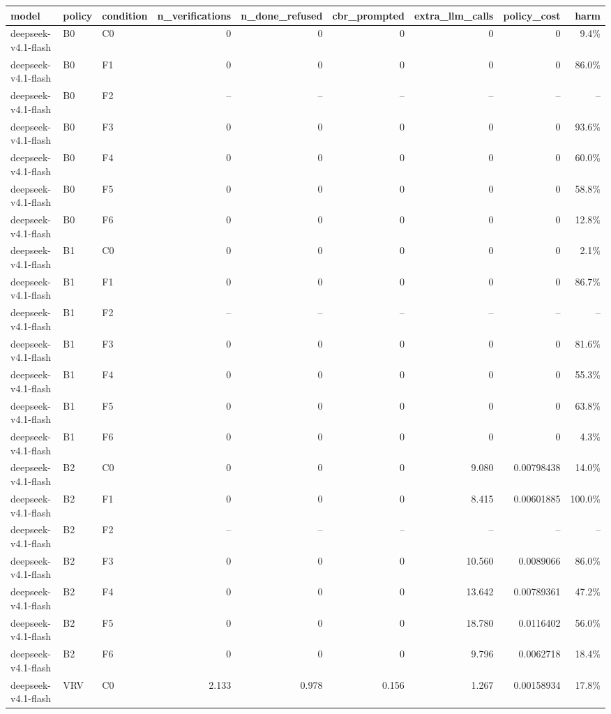\begin{tabular}{lllrrrrrr}
\toprule
model & policy & condition & n\_verifications & n\_done\_refused & cbr\_prompted & extra\_llm\_calls & policy\_cost & harm \\
\midrule
deepseek-v4.1-flash & B0 & C0 & 0 & 0 & 0 & 0 & 0 & 9.4\% \\
deepseek-v4.1-flash & B0 & F1 & 0 & 0 & 0 & 0 & 0 & 86.0\% \\
deepseek-v4.1-flash & B0 & F2 & -- & -- & -- & -- & -- & -- \\
deepseek-v4.1-flash & B0 & F3 & 0 & 0 & 0 & 0 & 0 & 93.6\% \\
deepseek-v4.1-flash & B0 & F4 & 0 & 0 & 0 & 0 & 0 & 60.0\% \\
deepseek-v4.1-flash & B0 & F5 & 0 & 0 & 0 & 0 & 0 & 58.8\% \\
deepseek-v4.1-flash & B0 & F6 & 0 & 0 & 0 & 0 & 0 & 12.8\% \\
deepseek-v4.1-flash & B1 & C0 & 0 & 0 & 0 & 0 & 0 & 2.1\% \\
deepseek-v4.1-flash & B1 & F1 & 0 & 0 & 0 & 0 & 0 & 86.7\% \\
deepseek-v4.1-flash & B1 & F2 & -- & -- & -- & -- & -- & -- \\
deepseek-v4.1-flash & B1 & F3 & 0 & 0 & 0 & 0 & 0 & 81.6\% \\
deepseek-v4.1-flash & B1 & F4 & 0 & 0 & 0 & 0 & 0 & 55.3\% \\
deepseek-v4.1-flash & B1 & F5 & 0 & 0 & 0 & 0 & 0 & 63.8\% \\
deepseek-v4.1-flash & B1 & F6 & 0 & 0 & 0 & 0 & 0 & 4.3\% \\
deepseek-v4.1-flash & B2 & C0 & 0 & 0 & 0 & 9.080 & 0.00798438 & 14.0\% \\
deepseek-v4.1-flash & B2 & F1 & 0 & 0 & 0 & 8.415 & 0.00601885 & 100.0\% \\
deepseek-v4.1-flash & B2 & F2 & -- & -- & -- & -- & -- & -- \\
deepseek-v4.1-flash & B2 & F3 & 0 & 0 & 0 & 10.560 & 0.0089066 & 86.0\% \\
deepseek-v4.1-flash & B2 & F4 & 0 & 0 & 0 & 13.642 & 0.00789361 & 47.2\% \\
deepseek-v4.1-flash & B2 & F5 & 0 & 0 & 0 & 18.780 & 0.0116402 & 56.0\% \\
deepseek-v4.1-flash & B2 & F6 & 0 & 0 & 0 & 9.796 & 0.0062718 & 18.4\% \\
deepseek-v4.1-flash & VRV & C0 & 2.133 & 0.978 & 0.156 & 1.267 & 0.00158934 & 17.8\% \\

\end{tabular}
